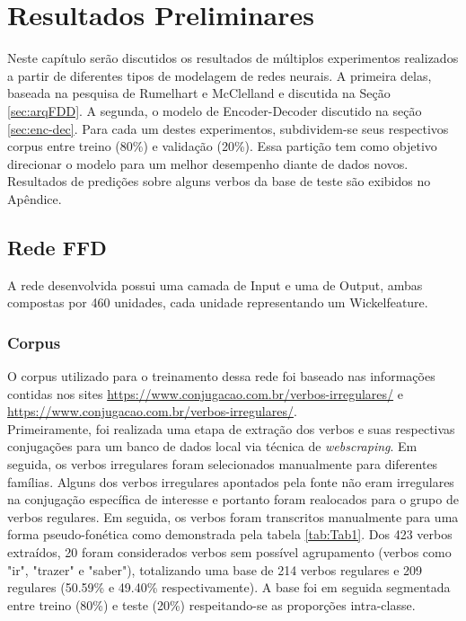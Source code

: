 \chapter{Resultados Preliminares}
\label{ch:03-results}


Neste capítulo serão discutidos os resultados de múltiplos experimentos realizados a partir de diferentes tipos de modelagem de redes neurais. A primeira delas, baseada na pesquisa de Rumelhart e McClelland e discutida na Seção \ref{sec:arqFDD}.
A segunda, o modelo de Encoder-Decoder discutido na seção \ref{sec:enc-dec}. Para cada um destes experimentos, subdividem-se seus respectivos corpus entre treino (80\%) e validação (20\%). Essa partição tem como objetivo direcionar o modelo para um melhor desempenho diante de dados novos. Resultados de predições sobre alguns verbos da base de teste são exibidos no Apêndice. 

\section{Rede FFD}
\label{sec:ffd}

A rede desenvolvida possui uma camada de Input e uma de Output, ambas compostas por 460 unidades, cada unidade representando um Wickelfeature.

\subsection{Corpus}
\label{sec:corpus-ffd}

O corpus utilizado para o treinamento dessa rede foi baseado nas informações contidas nos sites \url{https://www.conjugacao.com.br/verbos-irregulares/} e \url{https://www.conjugacao.com.br/verbos-irregulares/}.\\

Primeiramente, foi realizada uma etapa de extração dos verbos e suas respectivas conjugações para um banco de dados local via técnica de \textit{webscraping}. Em seguida, os verbos irregulares foram selecionados manualmente para diferentes famílias. Alguns dos verbos irregulares apontados pela fonte não eram irregulares na conjugação específica de interesse e portanto foram realocados para o grupo de verbos regulares. Em seguida, os verbos foram transcritos manualmente para uma forma pseudo-fonética como demonstrada pela tabela \ref{tab:Tab1}. Dos 423 verbos extraídos, 20 foram considerados verbos sem possível agrupamento (verbos como "ir", "trazer" e "saber"), totalizando uma base de 214 verbos regulares e 209 regulares (50.59\% e 49.40\% respectivamente). A base foi em seguida segmentada entre treino (80\%) e teste (20\%) respeitando-se as proporções intra-classe.  

